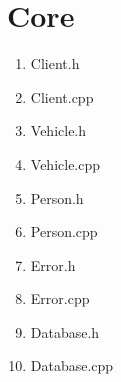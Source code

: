 \documentclass[12pt]{report}
\begin{document}
\newpage
\section{Core}
\begin{enumerate}
    \item Client.h
    
    \item Client.cpp
    
    \newpage
    \item Vehicle.h
    
    \newpage
    \item Vehicle.cpp
    
    \newpage
    \item Person.h
    
    \item Person.cpp
    
    \newpage
    \item Error.h
    
    \item Error.cpp
    
    \newpage
    \item Database.h
    
    \item Database.cpp
    
\end{enumerate}
\newpage
\end{document}
